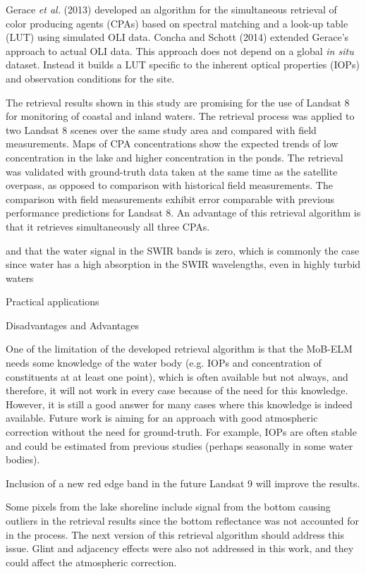 Gerace {\it et al.} (2013)\cite{Gerace:2013} developed an algorithm for the simultaneous retrieval of color producing agents (CPAs) based on spectral matching and a look-up table (LUT) using simulated OLI data. Concha and Schott (2014)\cite{Concha2013IGARSS} extended Gerace's approach to actual OLI data. This approach does not depend on a global {\it in situ} dataset. Instead it builds a LUT specific to the inherent optical properties (IOPs) and observation conditions for the site.

The retrieval results shown in this study are promising for the use of Landsat 8 for monitoring of coastal and inland waters. The retrieval process was applied to two Landsat 8 scenes over the same study area and compared with field measurements. Maps of CPA concentrations show the expected trends of low concentration in the lake and higher concentration in the ponds. The retrieval was validated with ground-truth data taken at the same time as the satellite overpass, as opposed to comparison with historical field measurements. The comparison with field measurements exhibit error comparable with previous performance predictions for Landsat 8. An advantage of this retrieval algorithm is that it retrieves simultaneously all three CPAs.



and that the water signal in the SWIR bands is zero, which is commonly the case since water has a high absorption in the SWIR wavelengths, even in highly turbid waters

Practical applications  

Disadvantages and Advantages


One of the limitation of the developed retrieval algorithm is that the MoB-ELM needs some knowledge of the water body (e.g. IOPs and concentration of constituents at at least one point), which is often available but not always, and therefore, it will not work in every case because of the need for this knowledge. However, it is still a good answer for many cases where this knowledge is indeed available. Future work is aiming for an approach with good atmospheric correction without the need for ground-truth. For example, IOPs are often stable and could be estimated from previous studies (perhaps seasonally in some water bodies).

Inclusion of a new red edge band in the future Landsat 9 will improve the results. 

Some pixels from the lake shoreline include signal from the bottom causing outliers in the retrieval results since the bottom reflectance was not accounted for in the process. The next version of this retrieval algorithm should address this issue. Glint and adjacency effects were also not addressed in this work, and they could affect the atmospheric correction.



